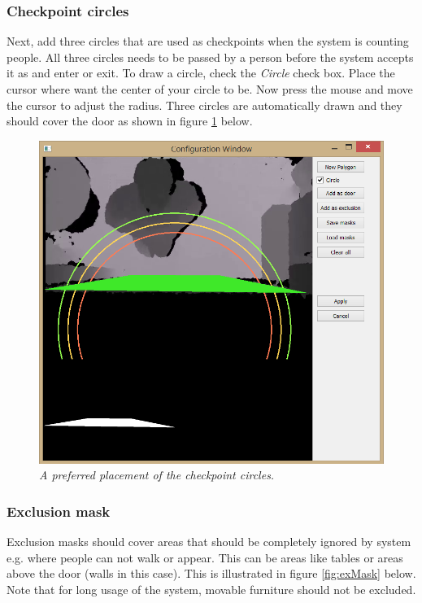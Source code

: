 \subsubsection{Checkpoint circles}
 Next, add three circles that are used as checkpoints when the system is counting people. All three circles needs to be passed by a person before the system accepts it as and enter or exit. To draw a circle, check the \textit{Circle} check box. Place the cursor where want the center of your circle to be. Now press the mouse and move the cursor to adjust the radius. Three circles are automatically drawn and they should cover the door as shown in figure \ref{fig:circlePlacement} below.

\begin{figure}[H]
	\centering
	\includegraphics[width=\linewidth]{images/Conf3.png}
	\caption[Checkpoint circles placement]{\textit{A preferred placement of the checkpoint circles. }}
	\label{fig:circlePlacement}  %
\end{figure}
\newpage

\subsubsection{Exclusion mask}
Exclusion masks should cover areas that should be completely ignored by system e.g. where people can not walk or appear. This can be areas like tables or areas above the door (walls in this case). This is illustrated in figure \ref{fig:exMask} below. Note that for long usage of the system, movable furniture should not be excluded.

